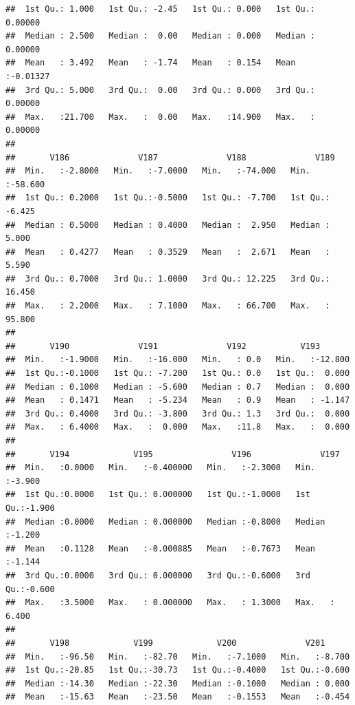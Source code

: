 \documentclass[
]{article}
\begin{document}
\begin{verbatim}
##  1st Qu.: 1.000   1st Qu.: -2.45   1st Qu.: 0.000   1st Qu.: 0.00000  
##  Median : 2.500   Median :  0.00   Median : 0.000   Median : 0.00000  
##  Mean   : 3.492   Mean   : -1.74   Mean   : 0.154   Mean   :-0.01327  
##  3rd Qu.: 5.000   3rd Qu.:  0.00   3rd Qu.: 0.000   3rd Qu.: 0.00000  
##  Max.   :21.700   Max.   :  0.00   Max.   :14.900   Max.   : 0.00000  
##                                                                       
##       V186              V187              V188              V189        
##  Min.   :-2.8000   Min.   :-7.0000   Min.   :-74.000   Min.   :-58.600  
##  1st Qu.: 0.2000   1st Qu.:-0.5000   1st Qu.: -7.700   1st Qu.: -6.425  
##  Median : 0.5000   Median : 0.4000   Median :  2.950   Median :  5.000  
##  Mean   : 0.4277   Mean   : 0.3529   Mean   :  2.671   Mean   :  5.590  
##  3rd Qu.: 0.7000   3rd Qu.: 1.0000   3rd Qu.: 12.225   3rd Qu.: 16.450  
##  Max.   : 2.2000   Max.   : 7.1000   Max.   : 66.700   Max.   : 95.800  
##                                                                         
##       V190              V191              V192           V193        
##  Min.   :-1.9000   Min.   :-16.000   Min.   : 0.0   Min.   :-12.800  
##  1st Qu.:-0.1000   1st Qu.: -7.200   1st Qu.: 0.0   1st Qu.:  0.000  
##  Median : 0.1000   Median : -5.600   Median : 0.7   Median :  0.000  
##  Mean   : 0.1471   Mean   : -5.234   Mean   : 0.9   Mean   : -1.147  
##  3rd Qu.: 0.4000   3rd Qu.: -3.800   3rd Qu.: 1.3   3rd Qu.:  0.000  
##  Max.   : 6.4000   Max.   :  0.000   Max.   :11.8   Max.   :  0.000  
##                                                                      
##       V194             V195                V196              V197       
##  Min.   :0.0000   Min.   :-0.400000   Min.   :-2.3000   Min.   :-3.900  
##  1st Qu.:0.0000   1st Qu.: 0.000000   1st Qu.:-1.0000   1st Qu.:-1.900  
##  Median :0.0000   Median : 0.000000   Median :-0.8000   Median :-1.200  
##  Mean   :0.1128   Mean   :-0.000885   Mean   :-0.7673   Mean   :-1.144  
##  3rd Qu.:0.0000   3rd Qu.: 0.000000   3rd Qu.:-0.6000   3rd Qu.:-0.600  
##  Max.   :3.5000   Max.   : 0.000000   Max.   : 1.3000   Max.   : 6.400  
##                                                                         
##       V198             V199             V200              V201       
##  Min.   :-96.50   Min.   :-82.70   Min.   :-7.1000   Min.   :-8.700  
##  1st Qu.:-20.85   1st Qu.:-30.73   1st Qu.:-0.4000   1st Qu.:-0.600  
##  Median :-14.30   Median :-22.30   Median :-0.1000   Median : 0.000  
##  Mean   :-15.63   Mean   :-23.50   Mean   :-0.1553   Mean   :-0.454  

\end{verbatim}
\end{document}
